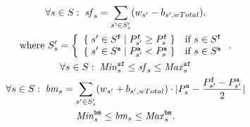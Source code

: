 \begin{gather}
\label{sf}
\forall s \in S:\;
\mi{sf}_s = \sum_{s' \in S'_s} (w_{s'} - b_{s',wTotal}),\\
\nonumber \text{where }S'_s = \left\{
\begin{array}{ll} \set{s' \in S^\trt{f}}{P^\trt{f}_{s'} \geq P^\trt{f}_s}&\text{if }s \in S^\trt{f}\\
									\set{s' \in S^\trt{a}}{P^\trt{a}_{s'} < P^\trt{a}_s}&\text{if }s \in S^\trt{a}\end{array}\right..
\\
\label{sfLim}\forall s \in S:\;
\mi{Min}^\trt{sf}_s \leq \mi{sf}_s \leq \mi{Max}^\trt{sf}_s\\
%
\label{bm}\forall s \in S:\;
\mi{bm}_s = 	\sum_{s' \in S'_s} (w_{s'} + b_{s',wTotal})\cdot |P^\trt{a}_s - \frac{P^\trt{f}_{s'}-P^\trt{a}_{s'}}{2}|\\
%
\label{bmLim}
\mi{Min}^\trt{bm}_s \leq \mi{bm}_s \leq \mi{Max}^\trt{bm}_s. 
\end{gather}
%